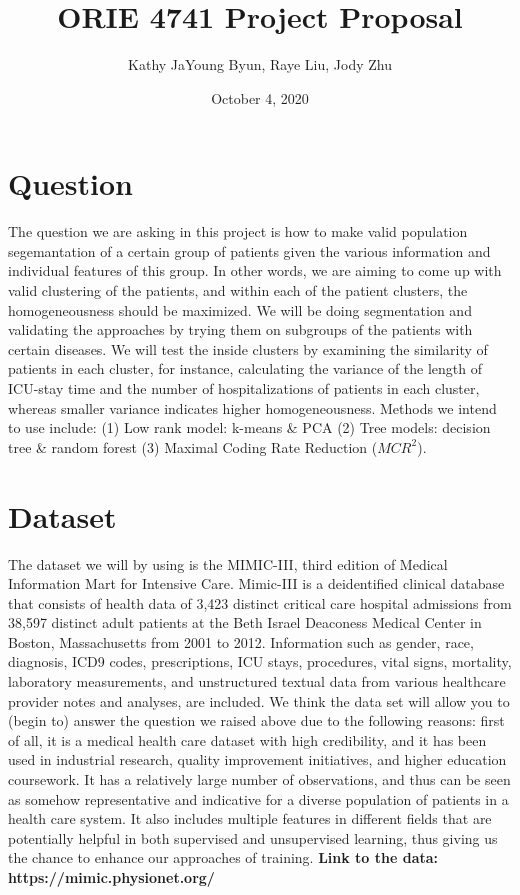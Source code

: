 \documentclass{article}
\title{ORIE 4741 Project Proposal}
\author{Kathy JaYoung Byun, Raye Liu, Jody Zhu}
\date{October 4, 2020}
\begin{document}
\maketitle

\section{Question}
The question we are asking in this project is how to make valid population segemantation of a certain group of patients given the various information and individual features of this group. In other words, we are aiming to come up with valid clustering of the patients, and within each of the patient clusters, the homogeneousness should be maximized.
\newline
We will be doing segmentation and validating the approaches by trying them on subgroups of the patients with certain diseases. We will test the inside clusters by examining the similarity of patients in each cluster, for instance, calculating the variance of the length of ICU-stay time and the number of hospitalizations of patients in each cluster, whereas smaller variance indicates higher homogeneousness. 
\newline
Methods we intend to use include: (1) Low rank model: k-means \& PCA (2) Tree models: decision tree \& random forest (3) Maximal Coding Rate Reduction ($MCR^2$).

\section{Dataset}
The dataset we will by using is the MIMIC-III, third edition of Medical Information Mart for Intensive Care. Mimic-III is a deidentified clinical database that consists of health data of 3,423 distinct critical care hospital admissions from 38,597 distinct adult patients at the Beth Israel Deaconess Medical Center in Boston, Massachusetts from 2001 to 2012. Information such as gender, race, diagnosis, ICD9 codes, prescriptions, ICU stays, procedures, vital signs, mortality, laboratory measurements, and  unstructured textual data from various healthcare provider notes and analyses, are included.
\newline
We think the data set will allow you to (begin to) answer the question we raised above due to the following reasons: first of all, it is a medical health care dataset with high credibility, and it has been used in industrial research, quality improvement initiatives, and higher education coursework. It has a relatively large number of observations, and thus can be seen as somehow representative and indicative for a diverse population of patients in a health care system. It also includes multiple features in different fields that are potentially helpful in both supervised and unsupervised learning, thus giving us the chance to enhance our approaches of training.
\newline
\textbf{Link to the data: https://mimic.physionet.org/}
\end{document}

